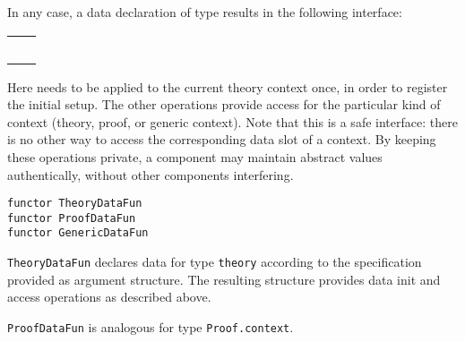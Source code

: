 \begin{isabellebody}
\begin{isamarkuptext}
  \bigskip In any case, a data declaration of type  results
  in the following interface:

  \medskip
  \begin{tabular}{ll}
  \isa{init{\isacharcolon}\ theory\ {\isasymrightarrow}\ theory} \\
  \isa{get{\isacharcolon}\ context\ {\isasymrightarrow}\ T} \\
  \isa{put{\isacharcolon}\ T\ {\isasymrightarrow}\ context\ {\isasymrightarrow}\ context} \\
  \isa{map{\isacharcolon}\ {\isacharparenleft}T\ {\isasymrightarrow}\ T{\isacharparenright}\ {\isasymrightarrow}\ context\ {\isasymrightarrow}\ context} \\
  \isa{print{\isacharcolon}\ context\ {\isasymrightarrow}\ unit}
  \end{tabular}
  \medskip

  \noindent Here  needs to be applied to the current
  theory context once, in order to register the initial setup.  The
  other operations provide access for the particular kind of context
  (theory, proof, or generic context).  Note that this is a safe
  interface: there is no other way to access the corresponding data
  slot of a context.  By keeping these operations private, a component
  may maintain abstract values authentically, without other components
  interfering.%
\end{isamarkuptext}%
\isamarkuptrue%
%
\isadelimmlref
%
\endisadelimmlref
%
\isatagmlref
%
\begin{isamarkuptext}%
\begin{mldecls}
  \verb|functor TheoryDataFun| \\
  \verb|functor ProofDataFun| \\
  \verb|functor GenericDataFun| \\
  \end{mldecls}

  \begin{description}

  \item \verb|TheoryDataFun| declares data for
  type \verb|theory| according to the specification provided as
  argument structure.  The resulting structure provides data init and
  access operations as described above.

  \item \verb|ProofDataFun| is analogous for
  type \verb|Proof.context|.


\end{description}
\end{isamarkuptext}
\end{isabellebody}

